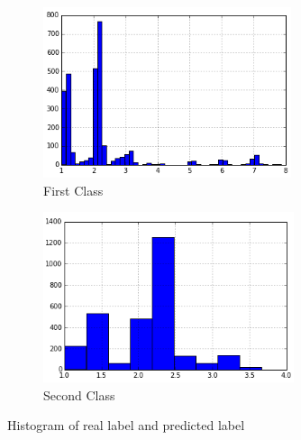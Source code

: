 \documentclass[a4paper, 11pt]{article}
\begin{document}
\begin{figure}[h]
 
\begin{subfigure}[l]{0.5\textwidth}
\includegraphics[width=0.9\linewidth, height=5cm]{pic/histy1.png} 
\caption{First Class}
\end{subfigure}
\begin{subfigure}[r]{0.5\textwidth}
\includegraphics[width=0.9\linewidth, height=5cm]{pic/histy2.png}
\caption{Second Class}
\end{subfigure}
 
\caption{Histogram of real label and predicted label}
\label{fig:hist}
\end{figure}
\end{document}
